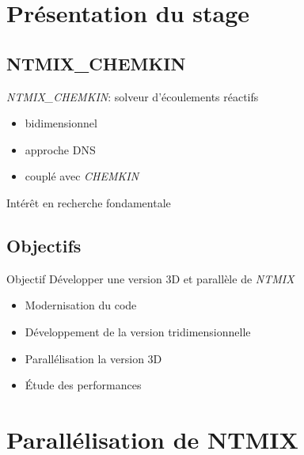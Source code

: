 \documentclass{beamer}
\begin{document}
%
%
\section{Présentation du stage}
\subsection{NTMIX\_CHEMKIN}
\begin{frame}
  \textit{NTMIX\_CHEMKIN}: solveur d'écoulements réactifs
  \begin{itemize}
  \item bidimensionnel
  \item approche DNS
  \item couplé avec \textit{CHEMKIN}
  \end{itemize}
  
  \vfill
  Intérêt en recherche fondamentale
  
\end{frame}


\subsection{Objectifs}
\begin{frame}

  \begin{block}{Objectif}
    Développer une version 3D et parallèle de \textit{NTMIX}
  \end{block}
  \begin{itemize}
  \item Modernisation du code
  \item Développement de la version tridimensionnelle
  \item Parallélisation la version 3D
  \item Étude des performances
  \end{itemize} 
\end{frame}


%
%

\section{Parallélisation de NTMIX}
\end{document}
